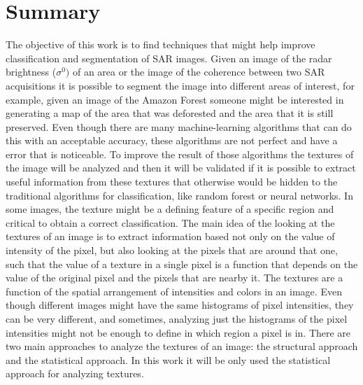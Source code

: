
\section*{Summary}
\label{sec:Summary_chap_2}
The objective of this work is to find techniques that might help improve classification and segmentation of SAR images.\newline
Given an image of the radar brightness ($\sigma^0)$ of an area or the image of the coherence between two SAR acquisitions it is possible to segment the image into different areas of interest, for example, given an image of the Amazon Forest someone might be interested in generating a map of the area that was deforested and the area that it is still preserved. \newline
Even though there are many machine-learning algorithms that can do this with an acceptable accuracy, these algorithms are not perfect and have a error that is noticeable. \newline
To improve the result of those algorithms the textures of the image will be analyzed and then it will be validated if it is possible to extract useful information from these textures that otherwise would be hidden to the traditional algorithms for classification, like random forest or neural networks.\newline
In some images, the texture might be a defining feature of a specific region and critical to obtain a correct classification.
The main idea of the looking at the textures of an image is to extract information based not only on the value of intensity of the pixel, but also looking at the pixels that are around that one, such that the value of a texture in a single pixel is a function that depends on the value of the original pixel and the pixels that are nearby it.\newline
The textures are a function of the spatial arrangement of intensities and colors in an image. Even though different images might have the same histograms of pixel intensities, they can be very different, and sometimes, analyzing just the histograms of the pixel intensities might not be enough to define in which region a pixel is in. There are two main approaches to analyze the textures of an image: the structural approach and the statistical approach. In this work it will be only used the statistical approach for analyzing textures.

